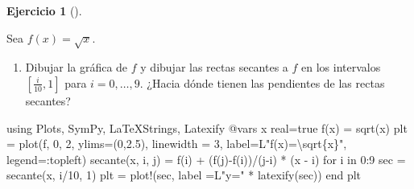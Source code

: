 \documentclass[
  a4paper,
]{scrreport}
\newenvironment{Shaded}{\begin{snugshade}}{\end{snugshade}}
\newcommand{\BuiltInTok}[1]{\textcolor[rgb]{0.00,0.23,0.31}{#1}}
\newcommand{\ConstantTok}[1]{\textcolor[rgb]{0.56,0.35,0.01}{#1}}
\newcommand{\ControlFlowTok}[1]{\textcolor[rgb]{0.00,0.23,0.31}{#1}}
\newcommand{\FloatTok}[1]{\textcolor[rgb]{0.68,0.00,0.00}{#1}}
\newcommand{\FunctionTok}[1]{\textcolor[rgb]{0.28,0.35,0.67}{#1}}
\newcommand{\ImportTok}[1]{\textcolor[rgb]{0.00,0.46,0.62}{#1}}
\newcommand{\KeywordTok}[1]{\textcolor[rgb]{0.00,0.23,0.31}{#1}}
\newcommand{\NormalTok}[1]{\textcolor[rgb]{0.00,0.23,0.31}{#1}}
\newcommand{\OperatorTok}[1]{\textcolor[rgb]{0.37,0.37,0.37}{#1}}
\newcommand{\PreprocessorTok}[1]{\textcolor[rgb]{0.68,0.00,0.00}{#1}}
\newcommand{\StringTok}[1]{\textcolor[rgb]{0.13,0.47,0.30}{#1}}
\providecommand{\tightlist}{%
  \setlength{\itemsep}{0pt}\setlength{\parskip}{0pt}}\usepackage{longtable,booktabs,array}
\theoremstyle{definition}
\newtheorem{exercise}{Ejercicio}[chapter]
\theoremstyle{remark}
\begin{document}
\leavevmode{}%
\begin{exercise}[]\label{exr-secantes-tangente}

Sea \(f(x)=\sqrt{x}\).

\begin{enumerate}
\def\labelenumi{\alph{enumi}.}
\tightlist
\item
  Dibujar la gráfica de \(f\) y dibujar las rectas secantes a \(f\) en
  los intervalos \([\frac{i}{10}, 1]\) para \(i=0,\ldots, 9\). ¿Hacia
  dónde tienen las pendientes de las rectas secantes?
\end{enumerate}

\begin{tcolorbox}[enhanced jigsaw, toprule=.15mm, arc=.35mm, bottomrule=.15mm, titlerule=0mm, bottomtitle=1mm, opacitybacktitle=0.6, colbacktitle=quarto-callout-tip-color!10!white, colframe=quarto-callout-tip-color-frame, opacityback=0, title=\textcolor{quarto-callout-tip-color}{\faLightbulb}\hspace{0.5em}{Solución}, breakable, colback=white, toptitle=1mm, leftrule=.75mm, coltitle=black, rightrule=.15mm, left=2mm]

\begin{Shaded}
\begin{Highlighting}[]
\ImportTok{using} \BuiltInTok{Plots}\NormalTok{, }\BuiltInTok{SymPy}\NormalTok{, }\BuiltInTok{LaTeXStrings}\NormalTok{, }\BuiltInTok{Latexify}
\PreprocessorTok{@vars}\NormalTok{ x real}\OperatorTok{=}\ConstantTok{true}
\FunctionTok{f}\NormalTok{(x) }\OperatorTok{=} \FunctionTok{sqrt}\NormalTok{(x)}
\NormalTok{plt }\OperatorTok{=} \FunctionTok{plot}\NormalTok{(f, }\FloatTok{0}\NormalTok{, }\FloatTok{2}\NormalTok{, ylims}\OperatorTok{=}\NormalTok{(}\FloatTok{0}\NormalTok{,}\FloatTok{2.5}\NormalTok{), linewidth }\OperatorTok{=} \FloatTok{3}\NormalTok{, label}\OperatorTok{=}\NormalTok{L}\StringTok{"f(x)=\textbackslash{}sqrt\{x\}"}\NormalTok{, legend}\OperatorTok{=:}\NormalTok{topleft)}
\FunctionTok{secante}\NormalTok{(x, i, j) }\OperatorTok{=} \FunctionTok{f}\NormalTok{(i) }\OperatorTok{+}\NormalTok{ (}\FunctionTok{f}\NormalTok{(j)}\FunctionTok{{-}f}\NormalTok{(i))}\OperatorTok{/}\NormalTok{(j}\OperatorTok{{-}}\NormalTok{i) }\OperatorTok{*}\NormalTok{ (x }\OperatorTok{{-}}\NormalTok{ i)}
\ControlFlowTok{for}\NormalTok{ i }\KeywordTok{in} \FloatTok{0}\OperatorTok{:}\FloatTok{9}
\NormalTok{    sec }\OperatorTok{=} \FunctionTok{secante}\NormalTok{(x, i}\OperatorTok{/}\FloatTok{10}\NormalTok{, }\FloatTok{1}\NormalTok{)}
\NormalTok{    plt }\OperatorTok{=} \FunctionTok{plot!}\NormalTok{(sec, label }\OperatorTok{=}\NormalTok{L}\StringTok{"y="} \OperatorTok{*} \FunctionTok{latexify}\NormalTok{(sec))}
\ControlFlowTok{end}
\NormalTok{plt}
\end{Highlighting}
\end{Shaded}


\end{tcolorbox}
\end{exercise}
\end{document}
